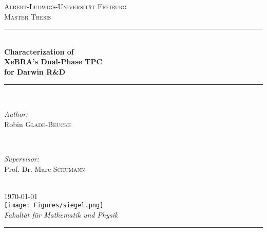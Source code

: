 \begin{titlepage}
\newcommand{\HRule}{\rule{\linewidth}{0.25mm}} %
\center
\textsc{\LARGE Albert-Ludwigs-Universit\"{a}t Freiburg}\\[1.5cm]
\textsc{\Large Master Thesis}\\[0.4cm]
\HRule \\[0.4cm]
\huge \textbf{Characterization of}\\\textbf{Xe\textsc{BRA}'s Dual-Phase TPC}\\\textbf{for Darwin R\&D}  %
\HRule \\[1.0cm]
\begin{minipage}{0.4\textwidth}
\begin{flushleft} \large
\emph{Author:}\\
Robin \textsc{Glade-Beucke} \\
\end{flushleft}
\end{minipage}
~
\begin{minipage}{0.4\textwidth}
\begin{flushright} \large
\emph{Supervisor:} \\
Prof. Dr. Marc \textsc{Schumann} \\
\end{flushright}
\end{minipage}\\[1cm]

{\large \today}\\[0.8cm]

\texttt{[image: Figures/siegel.png]}\\[1cm]

\large \emph{Fakult\"{a}t f\"{u}r Mathematik und Physik}\\[0.4cm]

\HRule \\
\setcounter{page}{0}
\end{titlepage}
